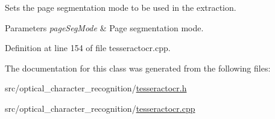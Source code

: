 Sets the page segmentation mode to be used in the extraction. 


\begin{DoxyParams}{Parameters}
{\em page\+Seg\+Mode} & Page segmentation mode. \\
\hline
\end{DoxyParams}


Definition at line 154 of file tesseractocr.\+cpp.



The documentation for this class was generated from the following files\+:\begin{DoxyCompactItemize}
\item 
src/optical\+\_\+character\+\_\+recognition/\mbox{\hyperlink{tesseractocr_8h}{tesseractocr.\+h}}\item 
src/optical\+\_\+character\+\_\+recognition/\mbox{\hyperlink{tesseractocr_8cpp}{tesseractocr.\+cpp}}\end{DoxyCompactItemize}
